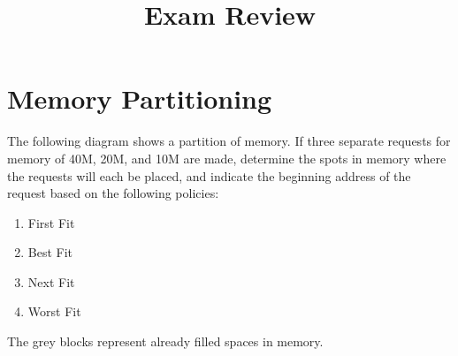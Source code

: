 \documentclass{article}
\title{Exam Review}
\date{}
\begin{document}
\maketitle

\newcommand{\specialcell}[2][c]{%
  \begin{tabular}[#1]{@{}c@{}}#2\end{tabular}}


\section{Memory Partitioning}

\indent The following diagram shows a partition of memory.
If three separate requests for memory of 40M, 20M, and 10M are made, determine
the spots in memory where the requests will each be placed, and indicate the
beginning address of the request based on the following policies:
\begin{enumerate}
\item First Fit
\item Best Fit
\item Next Fit
\item Worst Fit
\end{enumerate}
The grey blocks represent already filled spaces in memory.
\end{document}
